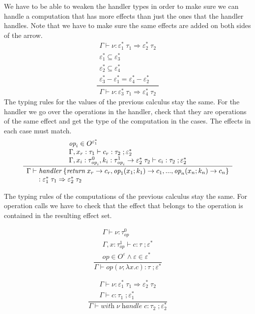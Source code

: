 \documentclass[12pt]{article}
\newcommand\eff[0]{\varepsilon}
\newcommand\effs[0]{\eff^*}
\newcommand\eop[0]{\textit{op}}
\newcommand\eops[1]{O^{#1}}
\newcommand\type[0]{\tau}
\newcommand\tarre[3]{#1 \rightarrow #2 \; #3}
\newcommand\thandler[4]{#1 \; #2 \Rightarrow #3 \; #4}
\newcommand\val[0]{\nu}
\newcommand\vhandler[1]{\textit{handler} \; \{#1\}}
\newcommand\comp[0]{c}
\newcommand\cop[4]{#1(#2 ; \lambda #3 . #4)}
\newcommand\chandle[2]{\textit{with} \; #1 \; \textit{handle} \; #2}
\begin{document}
We have to be able to weaken the handler types in order to make sure we can handle a computation that has more effects than just the ones that the handler handles. Note that we have to make sure the same effects are added on both sides of the arrow.
\[\frac{
	\begin{array}{l}
	\Gamma \vdash \val : \thandler{\effs_1}{\type_1}{\effs_2}{\type_2} \\
	\effs_1 \subseteq \effs_3 \\
	\effs_2 \subseteq \effs_4 \\
	\effs_3 - \effs_1 = \effs_4 - \effs_2
	\end{array}
}{
	\begin{array}{l}
	\Gamma \vdash \val : \thandler{\effs_3}{\type_1}{\effs_4}{\type_2}
	\end{array}
}\]
\newpage
The typing rules for the values of the previous calculus stay the same.
For the handler we go over the operations in the handler, check that they are operations of the same effect and get the type of the computation in the cases. The effects in each case must match.
\[\frac{
	\begin{array}{l}
	\eop_i \in \eops{\effs_1} \\
	\Gamma , x_r : \type_1 \vdash \comp_r : \type_2 \; ; \effs_2 \\
	\Gamma , x_i : \type^0_{\eop_i} , k_i : \tarre{\type^1_{\eop_i}}{\effs_2}{\type_2} \vdash \comp_i : \type_2 \; ; \effs_2
	\end{array}
}{
	\begin{array}{l}
	\Gamma \vdash \vhandler{
		\textit{return} \; x_r \rightarrow \comp_r,
		\eop_1 ( x_1 ; k_1 ) \rightarrow \comp_1,
		...,
		\eop_n ( x_n ; k_n ) \rightarrow \comp_n
	} \\ \indent : \thandler{\effs_1}{\type_1}{\effs_2}{\type_2}
	\end{array}
}\]

The typing rules of the computations of the previous calculus stay the same. For operation calls we have to check that the effect that belongs to the operation is contained in the resulting effect set. \\
\begin{minipage}{0.5\textwidth}
\[\frac{
	\begin{array}{l}
	\Gamma \vdash \val : \type^0_\eop \\
	\Gamma , x : \type^1_\eop \vdash \comp : \type \; ; \effs \\
	\eop \in \eops{\eff} \land \eff \in \effs
	\end{array}
}{
	\Gamma \vdash \cop{\eop}{\val}{x}{\comp} : \type \; ; \effs
}\]
\end{minipage}
\begin{minipage}{0.5\textwidth}
\[\frac{
	\begin{array}{l}
	\Gamma \vdash \val : \thandler{\effs_1}{\type_1}{\effs_2}{\type_2} \\
	\Gamma \vdash \comp : \type_1 \; ;\effs_1
	\end{array}
}{
	\Gamma \vdash \chandle{\val}{\comp} : \type_2 \; ; \effs_2
}\]
\end{minipage}
\end{document}
